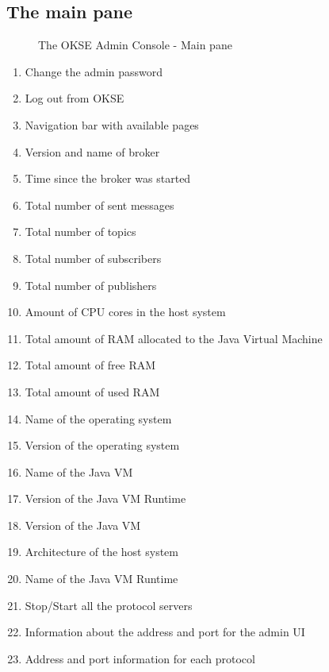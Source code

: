 \subsection{The main pane}
\begin{center}
  \begin{figure}[ht!]
    \caption{The OKSE Admin Console - Main pane} 
    \label{fig:OKSE Admin Console - Main pane}
  \end{figure}
\end{center}
\begin{enumerate}
\item Change the admin password
\item Log out from OKSE
\item Navigation bar with available pages
\item Version and name of broker
\item Time since the broker was started
\item Total number of sent messages
\item Total number of topics
\item Total number of subscribers
\item Total number of publishers
\item Amount of CPU cores in the host system
\item Total amount of RAM allocated to the Java Virtual Machine
\item Total amount of free RAM
\item Total amount of used RAM
\item Name of the operating system
\item Version of the operating system
\item Name of the Java VM
\item Version of the Java VM Runtime
\item Version of the Java VM
\item Architecture of the host system
\item Name of the Java VM Runtime
\item Stop/Start all the protocol servers
\item Information about the address and port for the admin UI
\item Address and port information for each protocol
\end{enumerate}

